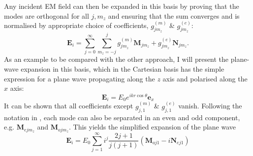 Any incident EM field can then be expanded in this basis by proving that the modes are orthogonal for all $j, m_z$ and ensuring that the sum converges and is normalised by appropriate choice of coefficients, $g^{(m)}_{jm_z}$ \& $g^{(e)}_{jm_z}$\cite{bohren}:
\begin{equation}\label{eq:E_i_expansion}
    \mathbf{E}_i = \sum_{j=0}^\infty \sum_{m_z=-j}^j g_{jm_z}^{(m)}\mathbf{M}_{jm_z}
    +g_{jm_z}^{(e)}\mathbf{N}_{jm_z}.
\end{equation}
As an example to be compared with the other approach, I will present the plane-wave expansion in this basis, which in the Cartesian basis has the simple expression for a plane wave propagating along the $z$ axis and polarised along the $x$ axis:
\begin{equation}\label{eq:PW_cart}
     \mathbf{E}_i = E_0e^{ikr\cos\theta}\mathrm{\mathbf{e}}_x
\end{equation}
It can be shown that all coefficients except $g^{(m)}_{j,1}$ \& $g^{(e)}_{j,1}$ vanish. Following the notation in \cite{bohren}, each mode can also be separated in an even and odd component, e.g. $\mathbf{M}_{ejm_z}$ and $\mathbf{M}_{ojm_z}$. This yields the simplified expansion of the plane wave
\begin{equation}\label{eq:PW_sph}
    \mathbf{E}_i=E_0\sum_{j=1}^\infty i^j \frac{2j+1}{j(j+1)}(\mathbf{M}_{oj1}-i\mathbf{N}_{ej1})
\end{equation}


